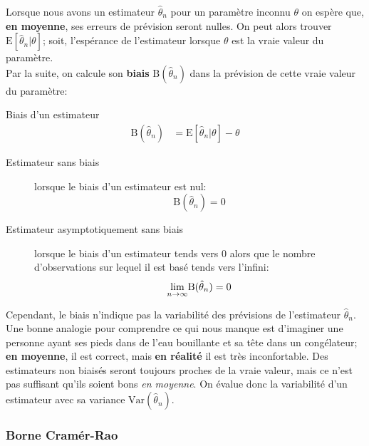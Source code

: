 \documentclass[10pt, french]{article}
\begin{document}
\begin{multicols*}{2}
Lorsque nous avons un estimateur $\hat{\theta}_{n}$ pour un paramètre inconnu $\theta$ on espère que, \textbf{en moyenne}, ses erreurs de prévision seront nulles. 
On peut alors trouver $\text{E}[\hat{\theta}_{n} | \theta]$; soit, l'espérance de l'estimateur lorsque $\theta$ est la vraie valeur du paramètre.	\\
Par la suite, on calcule son \textbf{biais} $\text{B}(\hat{\theta}_{n})$ dans la prévision de cette vraie valeur du paramètre:
\begin{algo}{Biais d'un estimateur}
\begin{align*}
	\text{B}(\hat{\theta}_{n}) 
	&= 	\text{E}[\hat{\theta}_{n} | \theta] - \theta
\end{align*}
\tcbline
\begin{description}
	\item[Estimateur sans biais]	lorsque le biais d'un estimateur est nul:
		 \[
		 	\text{B}(\hat{\theta}_{n}) = 0
		 \]
	\item[Estimateur asymptotiquement sans biais]	lorsque le biais d'un estimateur tends vers 0 alors que le nombre d'observations sur lequel il est basé tends vers l'infini: 
		\[
			\underset{n \rightarrow \infty}{\lim}\text{B}(\hat{\theta}_{n}) = 0
		\]
\end{description}
\end{algo}

Cependant, le biais n'indique pas la variabilité des prévisions de l'estimateur $\hat{\theta}_{n}$. Une bonne analogie pour comprendre ce qui nous manque est d’imaginer une personne ayant ses pieds dans de l'eau bouillante et sa tête dans un congélateur; \textbf{en moyenne}, il est correct, mais \textbf{en réalité} il est très inconfortable. Des estimateurs non biaisés seront toujours proches de la vraie valeur, mais ce n'est pas suffisant qu'ils soient bons \textit{en moyenne}. On évalue donc la variabilité d'un estimateur avec sa variance $\text{Var}(\hat{\theta}_{n})$.

\subsubsection{Borne Cramér-Rao}
\label{sec:cramer_rao}


\end{multicols*}
\end{document}
